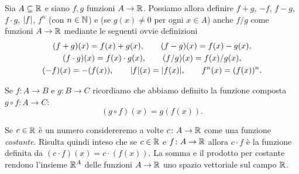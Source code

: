   \begin{definition}
  Sia $A \subseteq {\mathbb R}$ e siano $f,g$ funzioni $A \to {\mathbb R}$.
  Possiamo allora definire
  $f+g$, $-f$, $f-g$, $f\cdot g$, ${\left|f\right|}$, $f^n$ (con $n\in {\mathbb N}$)
  e (se $g(x)\neq 0$ per ogni $x\in A$) anche $f/g$
  come funzioni $A \to {\mathbb R}$ mediante le seguenti ovvie
  definizioni
  \begin{gather*}
  (f+g)(x) = f(x) + g(x), \qquad
  (f-g)(x) = f(x) - g(x), \\
  (f\cdot g)(x) = f(x) \cdot g(x), \qquad
  (f/g)(x) = f(x) / g(x), \\
  (-f)(x) = -(f(x)), \qquad
  {\left|f\right|}(x) = {\left|f(x)\right|}, \qquad
  f^n(x) = (f(x))^n.
  \end{gather*}
  
  Se $f\colon A \to B$ e $g\colon B\to C$ ricordiamo
  che abbiamo definito la funzione composta
  $g\circ f\colon A \to C$:
  \[
    (g\circ f)(x) = g(f(x)).
  \]
  
  Se $c\in {\mathbb R}$ è un numero considereremo a volte $c\colon A \to {\mathbb R}$
  come una funzione \emph{costante}.
  Risulta quindi inteso che se $c\in {\mathbb R}$ e $f\colon A \to {\mathbb R}$
  allora $c\cdot f$ è la funzione definita da
  $(c\cdot f)(x) = c\cdot (f(x))$.
  La somma e il prodotto per costante rendono l'insieme ${\mathbb R}^A$
  delle funzioni $A \to {\mathbb R}$ uno spazio vettoriale sul campo ${\mathbb R}$.
  \end{definition}
  
